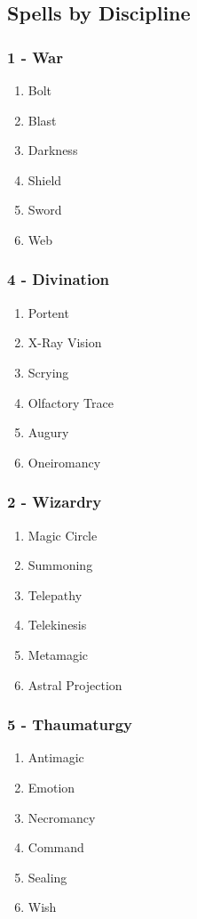 \subsection{Spells by Discipline}
\label{sec:spell-list}
\begin{multicols}{3}
\subsubsection*{1 - War}
\begin{enumerate}
    \item {Bolt}
    \item {Blast}
    \item {Darkness}
    \item {Shield}
    \item {Sword}
    \item {Web}
\end{enumerate}
\subsubsection*{4 - Divination }
\begin{enumerate}
    \item {Portent}
    \item {X-Ray Vision}
    \item {Scrying}
    \item {Olfactory Trace}
    \item {Augury}
    \item {Oneiromancy}
\end{enumerate}
\subsubsection*{2 - Wizardry}
\begin{enumerate}
    \item {Magic Circle}
    \item {Summoning}
    \item {Telepathy}
    \item {Telekinesis}
    \item {Metamagic}
    \item {Astral Projection}
\end{enumerate}
\subsubsection*{5 - Thaumaturgy }
\begin{enumerate}
    \item {Antimagic}
    \item {Emotion}
    \item {Necromancy}
    \item {Command}
    \item {Sealing}
    \item {Wish}
\end{enumerate}

\end{multicols}
